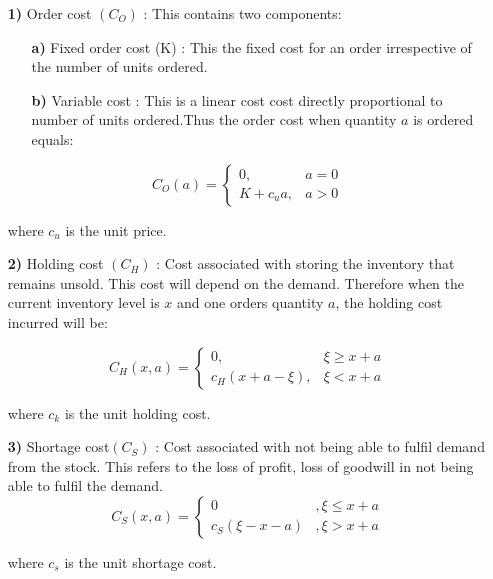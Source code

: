 \documentclass[11pt,a4paper,oneside]{report}
\begin{document}
\begin{enumerate}
\item[\textbf{1)}] Order cost $(C_O)$ : This contains two components:
\begin{enumerate}
\item[\textbf{a)}] Fixed order cost (K) : This the fixed cost for an order irrespective of the number of units ordered.
\item[\textbf{b)}] Variable cost : This is a linear cost cost directly proportional to number of units ordered.Thus the order cost when quantity $a$  is ordered equals:\\
\end{enumerate}
\begin{equation}
C_O(a) = 
\begin{cases}
0 ,            &a=0\\
K+ c_u {a} ,                &a>0
\end{cases}
\end{equation}

\hspace{6mm} where  $c_u$  is the unit price.

\item[\textbf{2)}]Holding cost $(C_H)$ : Cost associated with storing the inventory that remains unsold. This cost will depend on the demand. Therefore when the current inventory level is $x$ and one orders quantity $a$, the holding cost incurred will be:

\begin{equation}
C_H(x,a) = 
\begin{cases}
0,   &\xi \geq x+a\\
c_H(x+a-\xi),     & \xi <x+a
\end{cases}
\end{equation}
\begin{flushleft}where $c_k$ is the unit holding cost.
\end{flushleft}

\item[\textbf{3)}]	Shortage cost$(C_S)$ : Cost associated with not being able to fulfil demand from the stock. 
This refers to the loss of profit, loss of goodwill in not being able to fulfil the demand.
\begin{equation}
C_S(x,a) = 
\begin{cases}
0          &,\xi \leq x+a\\
c_S(\xi-x-a)     &  ,\xi >x+a
\end{cases}
\end{equation}
\begin{flushleft}where $c_s$ is the unit shortage cost.
\end{flushleft}
\end{enumerate}
\end{document}
